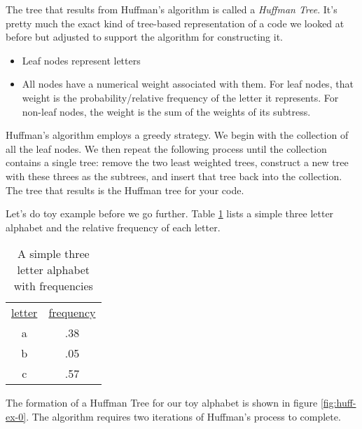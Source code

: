 \documentclass[]{tufte-handout}
\begin{document}
The tree that results from Huffman's algorithm is called a \textit{Huffman Tree}.  It's pretty much the exact kind of tree-based representation of a code we looked at before but adjusted to support the algorithm for constructing it. 
\begin{itemize}
\item Leaf nodes represent letters
\item All nodes have a numerical weight associated with them. For leaf nodes, that weight is the probability/relative frequency of the letter it represents. For non-leaf nodes, the weight is the sum of the weights of its subtress. 
\end{itemize}  
Huffman's algorithm employs a greedy strategy. We begin with the collection of all the leaf nodes. We then repeat the following process until the collection contains a single tree: remove the two least weighted trees, construct a new tree with these threes as the subtrees, and insert that tree back into the collection. The tree that results is the Huffman tree for your code. 

Let's do toy example before we go further. Table \ref{tab:huff-ex} lists a simple three letter alphabet and the relative frequency of each letter. 
\begin{table}
\begin{tabular}{cc}
\underline{letter} & \underline{frequency} \\ 
a & .38 \\
b & .05 \\
c & .57 
\end{tabular}
\label{tab:huff-ex}
\caption{A simple three letter alphabet with frequencies}
\end{table}

The formation of a Huffman Tree for our toy alphabet is shown in figure \ref{fig:huff-ex-0}. The algorithm requires two iterations of Huffman's process to complete.  
\end{document}
